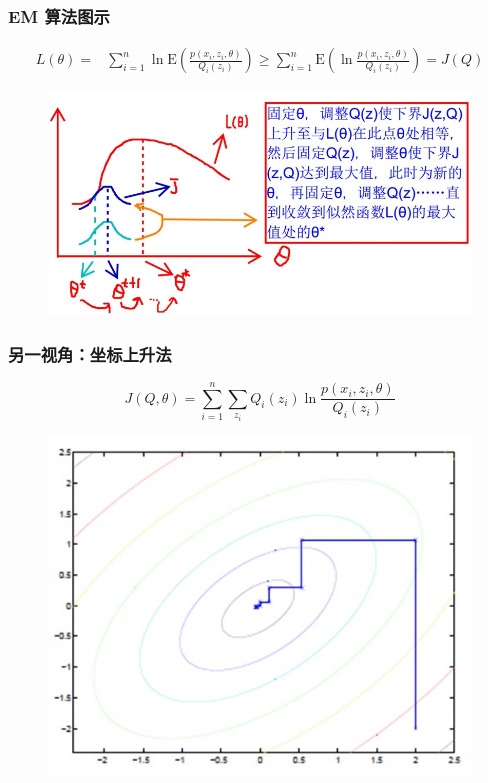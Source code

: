 \documentclass{beamer}
\def\E{\mathrm{E}}
\newcommand{\Gh}{\theta}
\begin{document}
\begin{frame}
    \frametitle{EM 算法图示}

    \[\begin{split}
        L(\Gh) = & \sum_{i = 1}^{n}\ln \E(\frac{p(x_i, z_i, \Gh)}{Q_i(z_i)}) \geq \sum_{i = 1}^{n} \E(\ln \frac{p(x_i, z_i, \Gh)}{Q_i(z_i)}) = J(Q)
    \end{split}\]
    
    \begin{figure}
        \centering
        \includegraphics[width=.8\textwidth]{res/em_function.png}
    \end{figure}

\end{frame}

\begin{frame}
    \frametitle{另一视角：坐标上升法}

    \[J(Q, \Gh) = \sum_{i = 1}^{n}\sum_{z_i}Q_i(z_i)\ln \frac{p(x_i, z_i, \Gh)}{Q_i(z_i)}\]

    \begin{figure}
        \centering
        \includegraphics[width=.6\textwidth]{res/coordinate_ascent.png}
    \end{figure}

\end{frame}
\end{document}
